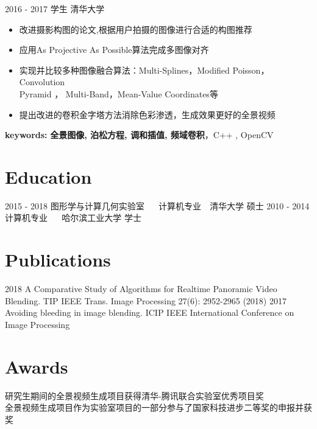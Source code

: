 \documentclass[]{cv-style} %
\begin{document}
\begin{entrylist}
\entry
  {2016 - 2017}
  {学生}
  {清华大学}
  {
    \vspace{-5pt}
    \leftmargini=-1cm
    \begin{itemize}
      \setlength{\itemsep}{3pt}
      \item {改进摄影构图的论文,根据用户拍摄的图像进行合适的构图推荐}
      \item {应用As Projective As Possible算法完成多图像对齐}
      \item {实现并比较多种图像融合算法：Multi-Splines，Modified Poisson，Convolution\\ Pyramid
      ， Multi-Band，Mean-Value Coordinates等}
      \item {提出改进的卷积金字塔方法消除色彩渗透，生成效果更好的全景视频}
    \end{itemize}
    \vspace{5pt}
    \hspace{-1.2cm} \textbf{keywords:} \textbf{全景图像, 泊松方程, 调和插值, 频域卷积}，{C++ , OpenCV}
}

\end{entrylist}
\vspace{-10pt}
\section{Education}
\begin{entrylist}
\vspace{-10pt}
\entry
{2015 - 2018}
{图形学与计算几何实验室 {\normalfont ~~ 计算机专业~~清华大学}}
{ 硕士}
{}
\vspace{-10pt}
\entry
{2010 - 2014}
{计算机专业 {\normalfont ~~ 哈尔滨工业大学}}
{ 学士}
{ }
\end{entrylist}
\vspace{-5pt} 
\section{Publications}
\begin{entrylist}
\entry
{2018}
{A Comparative Study of Algorithms for Realtime Panoramic Video Blending.}
{TIP}
{ IEEE Trans. Image Processing 27(6): 2952-2965 (2018)}
\entry
{2017}
{Avoiding bleeding in image blending.}
{ICIP}
{IEEE International Conference on Image Processing}
\end{entrylist}
\vspace{-10pt}
\section{Awards}
\begin{entrylist}
  \vspace{5pt}
   \hspace{0.2cm}研究生期间的全景视频生成项目获得清华-腾讯联合实验室优秀项目奖\\
   \hspace{0.2cm}全景视频生成项目作为实验室项目的一部分参与了国家科技进步二等奖的申报并获奖
\end{entrylist}
\end{document}
